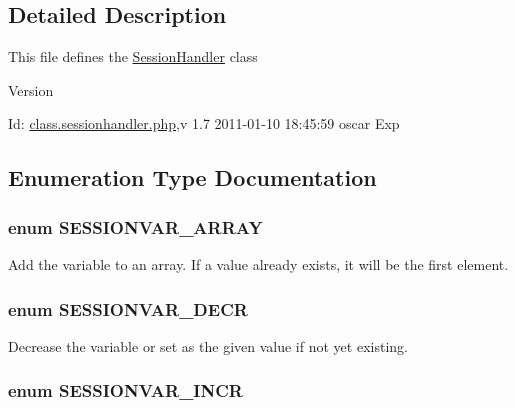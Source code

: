 \subsection{Detailed Description}
This file defines the \hyperlink{classSessionHandler}{SessionHandler} class \begin{DoxyVersion}{Version}

\end{DoxyVersion}
\begin{DoxyParagraph}{Id:}
\hyperlink{class_8sessionhandler_8php}{class.sessionhandler.php},v 1.7 2011-\/01-\/10 18:45:59 oscar Exp 
\end{DoxyParagraph}


\subsection{Enumeration Type Documentation}
\subsubsection[{SESSIONVAR\_\-ARRAY}]{\setlength{\rightskip}{0pt plus 5cm}enum {\bf SESSIONVAR\_\-ARRAY}}\label{class_8sessionhandler_8php_a37ebf617beca75ce8d60f06b8c37423a}


Add the variable to an array. If a value already exists, it will be the first element. 

\subsubsection[{SESSIONVAR\_\-DECR}]{\setlength{\rightskip}{0pt plus 5cm}enum {\bf SESSIONVAR\_\-DECR}}\label{class_8sessionhandler_8php_a25d82db99af8d3372efbccb0917f33cb}


Decrease the variable or set as the given value if not yet existing. 

\subsubsection[{SESSIONVAR\_\-INCR}]{\setlength{\rightskip}{0pt plus 5cm}enum {\bf SESSIONVAR\_\-INCR}}\label{class_8sessionhandler_8php_acf42fdbedc1bd30daaebadb12f63c75c}


